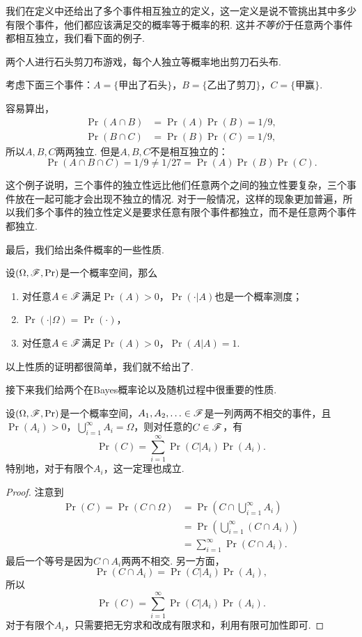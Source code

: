 我们在定义中还给出了多个事件相互独立的定义，这一定义是说不管挑出其中多少有限个事件，他们都应该满足交的概率等于概率的积. 这并\textit{不等价}于任意两个事件都相互独立，我们看下面的例子. 

\begin{example}
两个人进行石头剪刀布游戏，每个人独立等概率地出剪刀石头布. 

考虑下面三个事件：$A=\{\text{甲出了石头}\}$，$B=\{\text{乙出了剪刀}\}$，$C=\{\text{甲赢}\}$.

容易算出，
\begin{align*}
    \Pr(A\cap B)&=\Pr(A)\Pr(B)=1/9,\\
    \Pr(B\cap C)&=\Pr(B)\Pr(C)=1/9,
\end{align*}
所以$A,B,C$两两独立. 但是$A,B,C$不是相互独立的：
\[\Pr(A\cap B\cap C)=1/9\neq 1/27=\Pr(A)\Pr(B)\Pr(C).\]
\end{example}

这个例子说明，三个事件的独立性远比他们任意两个之间的独立性要复杂，三个事件放在一起可能才会出现不独立的情况. 对于一般情况，这样的现象更加普遍，所以我们多个事件的独立性定义是要求任意有限个事件都独立，而不是任意两个事件都独立. 

最后，我们给出条件概率的一些性质. 

\begin{proposition}\label{proposition:conditional-probability}
设$(\Omega,\mathscr{F},\Pr)$是一个概率空间，那么
\begin{enumerate}
    \item 对任意$A\in\mathscr{F}$满足$\Pr(A)>0$，$\Pr(\cdot|A)$也是一个概率测度；
    \item $\Pr(\cdot|\Omega)=\Pr(\cdot)$，
    \item 对任意$A\in\mathscr{F}$满足$\Pr(A)>0$，$\Pr(A|A)=1$.
\end{enumerate}
\end{proposition}
以上性质的证明都很简单，我们就不给出了. 

接下来我们给两个在Bayes概率论以及随机过程中很重要的性质. 

\begin{theorem}[全概率公式]\label{theorem:total-probability}
设$(\Omega,\mathscr{F},\Pr)$是一个概率空间，$A_1,A_2,\ldots\in\mathscr{F}$是一列两两不相交的事件，且$\Pr(A_i)>0$，$\bigcup_{i=1}^\infty A_i=\Omega$，则对任意的$C\in\mathscr{F}$，有
\[
    \Pr(C) = \sum_{i=1}^\infty \Pr(C|A_i)\Pr(A_i).
\]
特别地，对于有限个$A_i$，这一定理也成立. 
\end{theorem}
\begin{proof}
注意到
\begin{align*}
    \Pr(C) = \Pr(C\cap \Omega) &= \Pr\left(C\cap\bigcup_{i=1}^\infty A_i\right)\\
    &= \Pr\left(\bigcup_{i=1}^\infty (C\cap A_i)\right)\\
    &= \sum_{i=1}^\infty \Pr(C\cap A_i).
\end{align*}
最后一个等号是因为$C\cap A_i$两两不相交. 另一方面，
\[
    \Pr(C\cap A_i) = \Pr(C|A_i)\Pr(A_i),
\]
所以
\[
    \Pr(C) = \sum_{i=1}^\infty \Pr(C|A_i)\Pr(A_i).
\]
对于有限个$A_i$，只需要把无穷求和改成有限求和，利用有限可加性即可. 
\end{proof}

